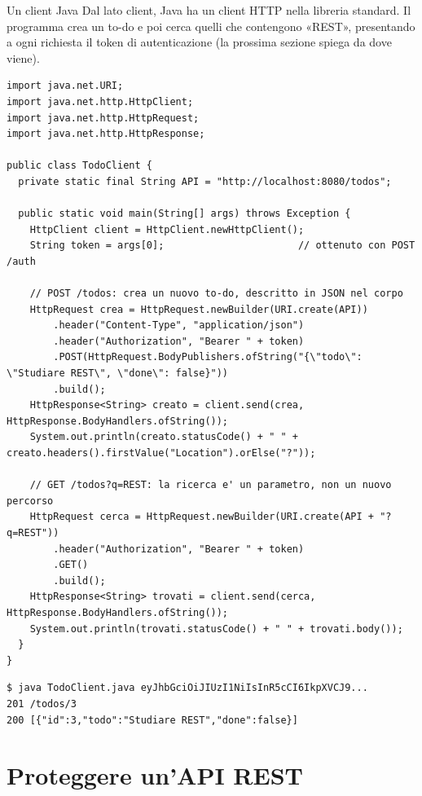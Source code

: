 \begin{esempio}{Un client Java}
Dal lato client, Java ha un client HTTP nella libreria standard. Il programma crea un to-do e poi cerca quelli che
contengono «REST», presentando a ogni richiesta il token di autenticazione (la prossima sezione spiega da dove viene).
\begin{lstlisting}[style=java, name=TodoClient.java]
import java.net.URI;
import java.net.http.HttpClient;
import java.net.http.HttpRequest;
import java.net.http.HttpResponse;

public class TodoClient {
  private static final String API = "http://localhost:8080/todos";

  public static void main(String[] args) throws Exception {
    HttpClient client = HttpClient.newHttpClient();
    String token = args[0];                       // ottenuto con POST /auth

    // POST /todos: crea un nuovo to-do, descritto in JSON nel corpo
    HttpRequest crea = HttpRequest.newBuilder(URI.create(API))
        .header("Content-Type", "application/json")
        .header("Authorization", "Bearer " + token)
        .POST(HttpRequest.BodyPublishers.ofString("{\"todo\": \"Studiare REST\", \"done\": false}"))
        .build();
    HttpResponse<String> creato = client.send(crea, HttpResponse.BodyHandlers.ofString());
    System.out.println(creato.statusCode() + " " + creato.headers().firstValue("Location").orElse("?"));

    // GET /todos?q=REST: la ricerca e' un parametro, non un nuovo percorso
    HttpRequest cerca = HttpRequest.newBuilder(URI.create(API + "?q=REST"))
        .header("Authorization", "Bearer " + token)
        .GET()
        .build();
    HttpResponse<String> trovati = client.send(cerca, HttpResponse.BodyHandlers.ofString());
    System.out.println(trovati.statusCode() + " " + trovati.body());
  }
}
\end{lstlisting}
\begin{lstlisting}[style=shell, name=Terminale]
$ java TodoClient.java eyJhbGciOiJIUzI1NiIsInR5cCI6IkpXVCJ9...
201 /todos/3
200 [{"id":3,"todo":"Studiare REST","done":false}]
\end{lstlisting}
\end{esempio}

\section{Proteggere un'API REST}

